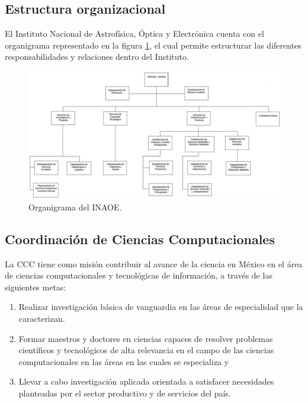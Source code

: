 \subsection{Estructura organizacional}
El Instituto Nacional de Astrofísica, Óptica y Electrónica cuenta con el organigrama representado en la figura \ref{organigrama}, el cual permite estructurar las diferentes responsabilidades y relaciones dentro del Instituto. 

\begin{figure}[!h]
    \centering
    \includegraphics[width=15cm]{img/organigrama.png}
    \caption{Organigrama del INAOE.}
    \label{organigrama}
\end{figure}

\subsection{Coordinación de Ciencias Computacionales}

La CCC tiene como misión contribuir al avance de la ciencia en México en el área de ciencias computacionales y tecnológicas de información, a través de las siguientes metas:

\begin{enumerate}
    \item Realizar investigación básica de vanguardia en las áreas de especialidad que la caracterizan.
    \item Formar maestros y doctores en ciencias capaces de resolver problemas científicos y tecnológicos de alta relevancia en el campo de las ciencias computacionales en las áreas en las cuales se especializa y
    \item Llevar a cabo investigación aplicada orientada a satisfacer necesidades planteadas por el sector productivo y de servicios del país.
\end{enumerate}

